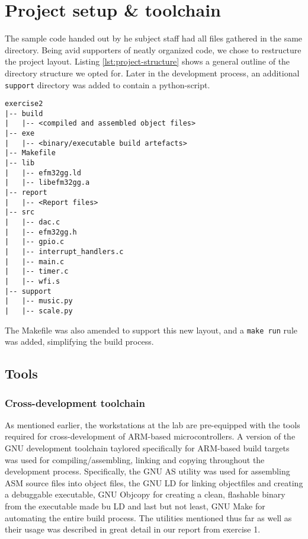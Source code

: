 \section{Project setup \& toolchain}

The sample code handed out by he subject staff had all files gathered in the same directory. Being avid supporters of neatly organized code, we chose to restructure the project layout. Listing \ref{lst:project-structure} shows a general outline of the directory structure we opted for. Later in the development process, an additional \texttt{support} directory was added to contain a python-script.

\begin{minipage}{\linewidth}
\begin{lstlisting}[label=lst:project-structure, caption=Revised project structure]
exercise2
|-- build
|   |-- <compiled and assembled object files>
|-- exe
|   |-- <binary/executable build artefacts>
|-- Makefile
|-- lib
|   |-- efm32gg.ld
|   |-- libefm32gg.a
|-- report
|   |-- <Report files>
|-- src
|   |-- dac.c
|   |-- efm32gg.h
|   |-- gpio.c
|   |-- interrupt_handlers.c
|   |-- main.c
|   |-- timer.c
|   |-- wfi.s
|-- support
|   |-- music.py
|   |-- scale.py
\end{lstlisting}
\end{minipage}

The Makefile was also amended to support this new layout, and a \texttt{make run} rule was added, simplifying the build process.

\subsection{Tools}

\subsubsection{Cross-development toolchain}

As mentioned earlier, the workstations at the lab are pre-equipped with the tools required for cross-development of ARM-based microcontrollers. A version of the GNU development toolchain taylored specifically for ARM-based build targets was used for compiling/assembling, linking and copying throughout the development process. Specifically, the GNU AS \cite[p.~4]{exercise1report} utility was used for assembling ASM source files into object files, the GNU LD \cite[p.~4]{exercise1report} for linking objectfiles and creating a debuggable executable, GNU Objcopy \cite[p.~5]{exercise1report} for creating a clean, flashable binary from the executable made bu LD and last but not least, GNU Make \cite[p.~5]{exercise1report} for automating the entire build process. The utilities mentioned thus far as well as their usage was described in great detail in our report from exercise 1.

